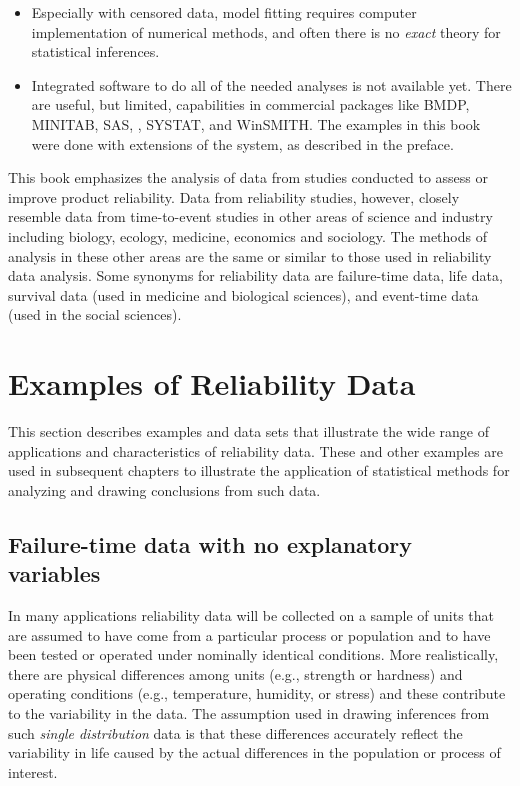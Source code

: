 \begin{itemize}
\item
Especially with censored data, model fitting requires computer
implementation of numerical methods, and often there is no {\em exact}
theory for statistical inferences.

\item 
Integrated software to do all of the needed analyses is not available
yet. There are useful, but limited, capabilities in commercial
packages like BMDP, MINITAB, SAS, \splus, SYSTAT, and WinSMITH. The
examples in this book were done with extensions of the \splus system,
as described in the preface.


\end{itemize}

This book emphasizes the analysis of data from studies conducted to
assess or improve product reliability.  Data from reliability studies,
however, closely resemble data from time-to-event studies in other
areas of science and industry including biology, ecology, medicine,
economics and sociology. The methods of analysis in these other
areas are the same or similar to those used in reliability data
analysis. Some synonyms for reliability data are failure-time data,
life data, survival data (used in medicine and  biological sciences),
and event-time data (used in the social sciences). 



\section{Examples of Reliability Data}
\label{section:data.examples}

This section describes examples and data sets
that illustrate the wide range of applications and
characteristics of reliability data. These and other examples 
are used in subsequent chapters 
to illustrate the application
of statistical methods for analyzing 
and drawing conclusions from such data.


\subsection{Failure-time data with no explanatory variables}
\label{section:ttf.with.no.exp}

In many applications reliability data will be collected on a 
sample of units that are assumed to have come from a particular
process or population and to have been tested or operated under
nominally identical conditions. More realistically, there are
physical differences among units (e.g., strength or hardness)
and operating conditions (e.g., temperature, humidity, or stress)
and these contribute to the variability in the data. The 
assumption used in drawing inferences from such {\em single
distribution} data is that these differences accurately 
reflect the variability in life caused by the
actual differences in the population or process of
interest.

